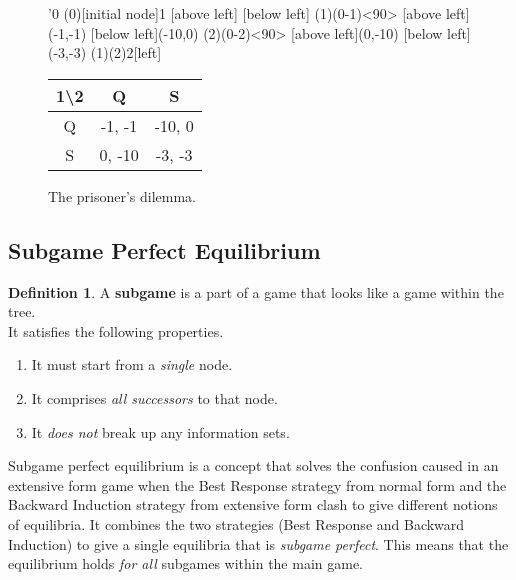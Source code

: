 \documentclass[11pt]{article}
\theoremstyle{definition}
\newtheorem*{definition}{Definition}
\begin{document}
\begin{figure}[h!]
\centering
\begin{minipage}{.5\textwidth}
	\centering
	\begin{istgame}
	\setistgrowdirection'{0}
	\xtdistance{15mm}{20mm}
	\istroot(0)[initial node]{1}
		[above left]
		[below left]
		\endist
	\xtdistance{20mm}{10mm}
	\istroot(1)(0-1)<90>
		[above left]{(-1,-1)}
		[below left]{(-10,0)}
		\endist
	\istroot(2)(0-2)<90>
		[above left]{(0,-10)}
		[below left]{(-3,-3)}
		\endist
	\xtInfoset(1)(2){2}[left]
	\end{istgame}
\end{minipage}%
\begin{minipage}{.5\textwidth}
	\centering
	\begin{tabular}{|c|c|c|}
		\hline
		1\textbackslash 2 & Q & S \\
		\hline
		Q & -1, -1 & -10, 0 \\
		\hline
		S & 0, -10 & -3, -3 \\
		\hline
	\end{tabular}
\end{minipage}
\label{fig:expris}
\caption{The prisoner's dilemma.}
\end{figure}

\subsection{Subgame Perfect Equilibrium}

\begin{definition}
A \textbf{subgame} is a part of a game that looks like a game within the tree.\\
It satisfies the following properties.
\begin{enumerate}
\item It must start from a \textit{single} node.
\item It comprises \textit{all successors} to that node.
\item It \textit{does not} break up any information sets.
\end{enumerate}
\end{definition}

Subgame perfect equilibrium is a concept that solves the confusion caused in an extensive form game when the Best Response strategy from normal form and the Backward Induction strategy from extensive form clash to give different notions of equilibria. It combines the two strategies (Best Response and Backward Induction) to give a single equilibria that is \textit{subgame perfect}. This means that the equilibrium holds \textit{for all} subgames within the main game. 
\end{document}
